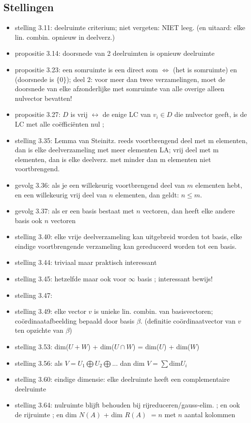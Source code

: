 \documentclass{article}
\begin{document}
\subsection{Stellingen}
\begin{itemize}
    \item stelling 3.11: deelruimte criterium; niet vergeten: NIET leeg. (en uitaard: elke lin. combin. opnieuw in deelverz.) 
    \item propositie 3.14: doorsnede van 2 deelruimten is opnieuw deelruimte
    \item propositie 3.23: een somruimte is een direct som $\Leftrightarrow$ (het is somruimte) en (doorsnede is $\{0\}$); deel 2: voor meer dan twee verzamelingen, moet de doorsnede van elke afzonderlijke met somruimte van alle overige alleen nulvector bevatten! 
    \item propositie 3.27: $D$ is vrij $\leftrightarrow$ de enige LC van $v_i \in D$ die nulvector geeft, is de LC met alle co\"effici\"enten nul ; 
    \item stelling 3.35: Lemma van Steinitz. reeds voortbrengend deel met m elementen, dan is elke deelverzameling met meer elementen LA; vrij deel met m elementen, dan is elke deelverz. met minder dan m elementen niet voortbrengend. 
    \item gevolg 3.36: als je een willekeurig voortbrengend deel van $m$ elementen hebt, en een willekeurig vrij deel van $n$ elementen, dan geldt: $n \leq m$. 
    \item gevolg 3.37: als er een basis bestaat met $n$ vectoren, dan heeft elke andere basis ook $n$ vectoren
    \item stelling 3.40: elke vrije deelverzameling kan uitgebreid worden tot basis, elke eindige voortbrengende verzameling kan gereduceerd worden tot een basis. 
    \item stelling 3.44: triviaal maar praktisch interessant
    \item stelling 3.45: hetzelfde maar ook voor $\infty$ basis ; interessant bewijs! 
    \item stelling 3.47: 
    \item stelling 3.49: elke vector $v$ is unieke lin. combin. van basisvectoren; co\"ordinaatafbeelding bepaald door basis $\beta$. (definitie co\"ordinaatvector van $v$ ten opzichte van $\beta$) 
    \item stelling 3.53: dim($U+W$) + dim($U \cap W$) = dim($U$) + dim($W$)
    \item stelling 3.56: als $V= U_1 \bigoplus U_2 \bigoplus ...$ dan dim $V = \sum \text{dim} U_i $
    \item stelling 3.60: eindige dimensie: elke deelruimte heeft een complementaire deelruimte 
    \item stelling 3.64: nulruimte blijft behouden bij rijreduceren/gauss-elim. ; en ook de rijruimte ; en dim $N(A)$ + dim $R(A)$ $=n$ met $n$ aantal kolommen 
\end{itemize}
\end{document}
